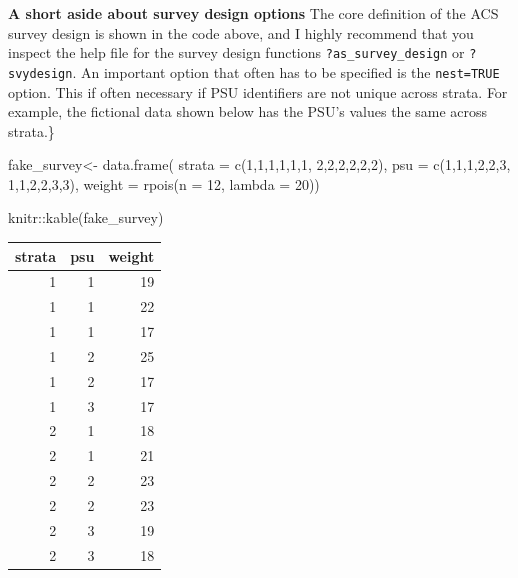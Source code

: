 \documentclass[
]{article}
\newenvironment{Shaded}{\begin{snugshade}}{\end{snugshade}}
\newcommand{\AttributeTok}[1]{\textcolor[rgb]{0.77,0.63,0.00}{#1}}
\newcommand{\DecValTok}[1]{\textcolor[rgb]{0.00,0.00,0.81}{#1}}
\newcommand{\FunctionTok}[1]{\textcolor[rgb]{0.00,0.00,0.00}{#1}}
\newcommand{\NormalTok}[1]{#1}
\newcommand{\OtherTok}[1]{\textcolor[rgb]{0.56,0.35,0.01}{#1}}
\newcommand{\SpecialCharTok}[1]{\textcolor[rgb]{0.00,0.00,0.00}{#1}}
\begin{document}
\textbf{A short aside about survey design options}
The core definition of the ACS survey design is shown in the code above, and I highly recommend that you inspect the help file for the survey design functions \texttt{?as\_survey\_design} or \texttt{?svydesign}. An important option that often has to be specified is the \texttt{nest=TRUE} option. This if often necessary if PSU identifiers are not unique across strata. For example, the fictional data shown below has the PSU's values the same across strata.\}

\begin{Shaded}
\begin{Highlighting}[]
\NormalTok{fake\_survey}\OtherTok{\textless{}{-}} \FunctionTok{data.frame}\NormalTok{(}
  \AttributeTok{strata =} \FunctionTok{c}\NormalTok{(}\DecValTok{1}\NormalTok{,}\DecValTok{1}\NormalTok{,}\DecValTok{1}\NormalTok{,}\DecValTok{1}\NormalTok{,}\DecValTok{1}\NormalTok{,}\DecValTok{1}\NormalTok{,}
             \DecValTok{2}\NormalTok{,}\DecValTok{2}\NormalTok{,}\DecValTok{2}\NormalTok{,}\DecValTok{2}\NormalTok{,}\DecValTok{2}\NormalTok{,}\DecValTok{2}\NormalTok{),}
  \AttributeTok{psu =} \FunctionTok{c}\NormalTok{(}\DecValTok{1}\NormalTok{,}\DecValTok{1}\NormalTok{,}\DecValTok{1}\NormalTok{,}\DecValTok{2}\NormalTok{,}\DecValTok{2}\NormalTok{,}\DecValTok{3}\NormalTok{,}
          \DecValTok{1}\NormalTok{,}\DecValTok{1}\NormalTok{,}\DecValTok{2}\NormalTok{,}\DecValTok{2}\NormalTok{,}\DecValTok{3}\NormalTok{,}\DecValTok{3}\NormalTok{),}
  \AttributeTok{weight =} \FunctionTok{rpois}\NormalTok{(}\AttributeTok{n =} \DecValTok{12}\NormalTok{, }\AttributeTok{lambda =} \DecValTok{20}\NormalTok{))}

\NormalTok{knitr}\SpecialCharTok{::}\FunctionTok{kable}\NormalTok{(fake\_survey)}
\end{Highlighting}
\end{Shaded}

\begin{tabular}{r|r|r}
\hline
strata & psu & weight\\
\hline
1 & 1 & 19\\
\hline
1 & 1 & 22\\
\hline
1 & 1 & 17\\
\hline
1 & 2 & 25\\
\hline
1 & 2 & 17\\
\hline
1 & 3 & 17\\
\hline
2 & 1 & 18\\
\hline
2 & 1 & 21\\
\hline
2 & 2 & 23\\
\hline
2 & 2 & 23\\
\hline
2 & 3 & 19\\
\hline
2 & 3 & 18\\
\hline
\end{tabular}
\end{document}
